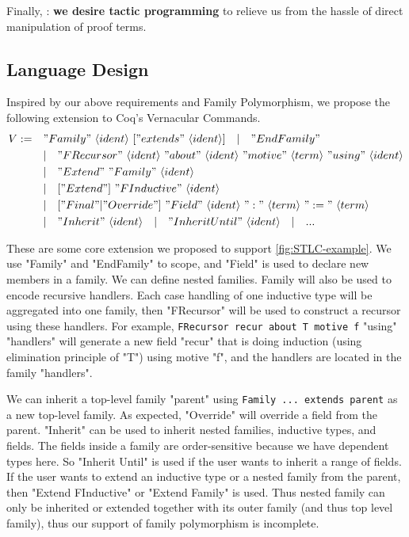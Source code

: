 Finally, : \textbf{we desire tactic
programming} to relieve us from the hassle of direct manipulation of proof terms.

\subsection{Language Design}
Inspired by our above requirements and Family Polymorphism, we propose
the following extension to Coq's Vernacular Commands.
\begin{align*}
  V := \quad &"Family"~\langle ident\rangle~["extends"~\langle ident\rangle] 
  \quad |\quad "EndFamily" \\
  & |\quad "FRecursor"~\langle ident\rangle~"about"~\langle ident\rangle~"motive"~\langle term\rangle~"using"~\langle ident\rangle \\
  & |\quad "Extend"~"Family"~\langle ident\rangle \\ 
  & |\quad ["Extend"]~"FInductive"~\langle ident\rangle \\ 
  & |\quad ["Final" | "Override"]~"Field"~\langle ident\rangle~":"~\langle term \rangle~":="~\langle term \rangle \\
  & | \quad "Inherit"~\langle ident\rangle \quad | \quad "Inherit Until"~\langle ident\rangle \quad | \quad ...
\end{align*}

These are some core extension we proposed to support \cref{fig:STLC-example}. We use "Family" and "EndFamily" to scope, and "Field" is used to declare new members in a family.
We can define nested families.
Family will also be used to encode recursive handlers. Each case
handling of one inductive type will be aggregated into one family, then
"FRecursor" will be used to construct a recursor using these handlers.
For example, \texttt{FRecursor recur about T motive f} "using"
"handlers" will generate a new field "recur" that is doing induction
(using elimination principle of "T") using motive "f", and the handlers
are located in the family "handlers".

We can inherit a top-level family "parent" using \texttt{Family
... extends parent} as a new top-level family. As expected, "Override"
will override a field from the parent. "Inherit" can be used to inherit
nested families, inductive types, and fields. The fields inside a family
are order-sensitive because we have dependent types here. So "Inherit
Until" is used if the user wants to inherit a range of fields. If the
user wants to extend an inductive type or a nested family from the
parent, then "Extend FInductive" or "Extend Family" is used. Thus nested
family can only be inherited or extended together with its outer family
(and thus top level family), thus our support of family polymorphism is
incomplete.

